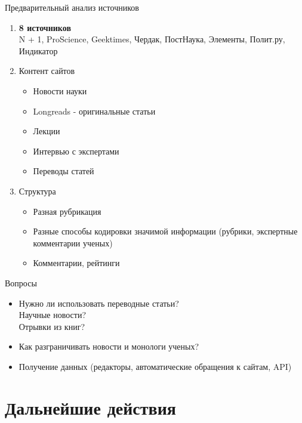 \documentclass{beamer}
\begin{document}
\begin{frame}{Предварительный анализ источников}
\begin{enumerate}
   \item \textbf{8 источников} \\
   		N + 1, ProScience, Geektimes, Чердак, ПостНаука, Элементы, Полит.ру, Индикатор
	\item Контент сайтов
    	\begin{itemize}
   		\item Новости науки
        \item Longreads - оригинальные статьи
        \item Лекции
        \item Интервью с экспертами
        \item Переводы статей
        \end{itemize}
    \item Структура
    	\begin{itemize}
        \item Разная рубрикация
        \item Разные способы кодировки значимой информации (рубрики, экспертные комментарии ученых)
        \item Комментарии, рейтинги
        \end{itemize}
\end{enumerate}
\end{frame}

\begin{frame}{Вопросы}
\begin{itemize}
	\item Нужно ли использовать переводные статьи? \\Научные новости? \\Отрывки из книг?
    \item Как разграничивать новости и монологи ученых?
    \item Получение данных (редакторы, автоматические обращения к сайтам, API)
\end{itemize}
\end{frame}

\section{Дальнейшие действия}
\end{document}
